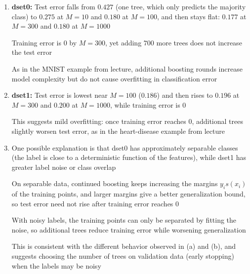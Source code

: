 \documentclass{article}
\begin{document}
\begin{enumerate}[label=\alph*.]
\item \textbf{dset0:} Test error falls from $0.427$ (one tree, which only predicts the majority class) to $0.275$ at $M=10$ and $0.180$ at $M=100$, and then stays flat: $0.177$ at $M=300$ and $0.180$ at $M=1000$

Training error is $0$ by $M=300$, yet adding $700$ more trees does not increase the test error

As in the MNIST example from lecture, additional boosting rounds increase model complexity but do not cause overfitting in classification error

\item \textbf{dset1:} Test error is lowest near $M=100$ ($0.186$) and then rises to $0.196$ at $M=300$ and $0.200$ at $M=1000$, while training error is $0$

This suggests mild overfitting: once training error reaches $0$, additional trees slightly worsen test error, as in the heart-disease example from lecture

\item One possible explanation is that dset0 has approximately separable classes (the label is close to a deterministic function of the features), while dset1 has greater label noise or class overlap

On separable data, continued boosting keeps increasing the margins $y_is(x_i)$ of the training points, and larger margins give a better generalization bound, so test error need not rise after training error reaches $0$

With noisy labels, the training points can only be separated by fitting the noise, so additional trees reduce training error while worsening generalization

This is consistent with the different behavior observed in (a) and (b), and suggests choosing the number of trees on validation data (early stopping) when the labels may be noisy
\end{enumerate}
\end{document}
